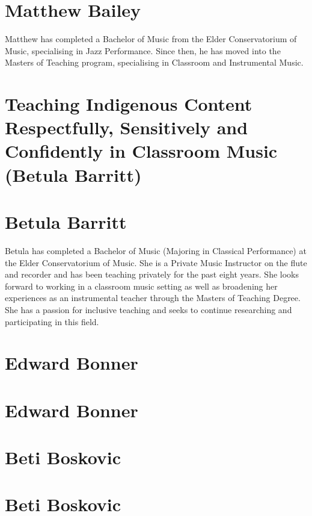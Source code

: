 \documentclass[twoside,14pt,a4paper,notitlepage]{memoir}
\begin{document}
\section*{Matthew Bailey}

Matthew has completed a Bachelor of Music from the Elder Conservatorium of Music, specialising in Jazz Performance. Since then, he has moved into the Masters of Teaching program, specialising in Classroom and Instrumental Music.



\section*{Teaching Indigenous Content Respectfully, Sensitively and Confidently in Classroom Music (Betula Barritt)}
\label{aut:barritt}

\section*{Betula Barritt}

Betula has completed a Bachelor of Music (Majoring in Classical Performance) at the Elder Conservatorium of Music. She is a Private Music Instructor on the flute and recorder and has been teaching privately for the past eight years. She looks forward to working in a classroom music setting as well as broadening her experiences as an instrumental teacher through the Masters of Teaching Degree. She has a passion for inclusive teaching and seeks to continue researching and participating in this field.


\section*{Edward Bonner}
\label{aut:bonner}

\lipsum[1-2]
\section*{Edward Bonner}
\lipsum[3]



\section*{Beti Boskovic}
\label{aut:boskovic}

\lipsum[1-2]
\section*{Beti Boskovic}
\lipsum[3]
\end{document}

